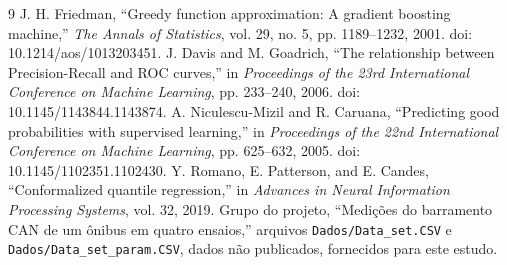 \documentclass[10pt,a4paper]{article}
\begin{document}
\clearpage
\begin{thebibliography}{9}
 J. H. Friedman, ``Greedy function approximation: A gradient boosting machine,'' \textit{The Annals of Statistics}, vol. 29, no. 5, pp. 1189--1232, 2001. doi: 10.1214/aos/1013203451.
 J. Davis and M. Goadrich, ``The relationship between Precision-Recall and ROC curves,'' in \textit{Proceedings of the 23rd International Conference on Machine Learning}, pp. 233--240, 2006. doi: 10.1145/1143844.1143874.
 A. Niculescu-Mizil and R. Caruana, ``Predicting good probabilities with supervised learning,'' in \textit{Proceedings of the 22nd International Conference on Machine Learning}, pp. 625--632, 2005. doi: 10.1145/1102351.1102430.
 Y. Romano, E. Patterson, and E. Candes, ``Conformalized quantile regression,'' in \textit{Advances in Neural Information Processing Systems}, vol. 32, 2019.
 Grupo do projeto, ``Medições do barramento CAN de um ônibus em quatro ensaios,'' arquivos \texttt{Dados/Data\_set.CSV} e \texttt{Dados/Data\_set\_param.CSV}, dados não publicados, fornecidos para este estudo.
\end{thebibliography}
\end{document}
